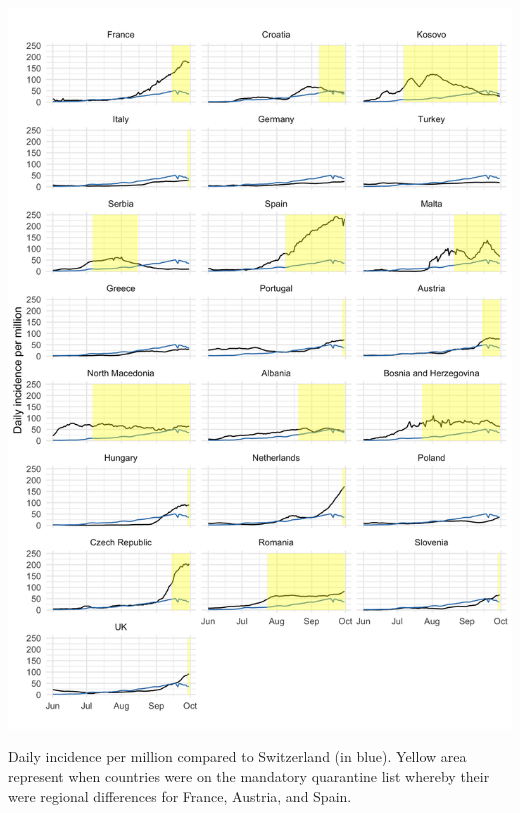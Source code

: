 \documentclass[10pt, a4paper, twoside]{article}
\begin{document}
\clearpage
\begin{suppfigure}[h]
\centering
\includegraphics[scale=0.125]{SF1_2021-06-02.png}
\caption{Daily incidence per million compared to Switzerland (in blue). Yellow area represent when countries were on the mandatory quarantine list whereby their were regional differences for France, Austria, and Spain.}
\label{sf1}
\end{suppfigure}
\end{document}
